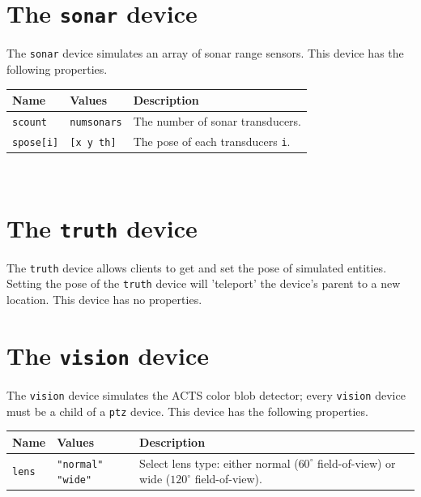 \documentclass[11pt]{report}
\begin{document}
\newpage
\section{The {\tt sonar} device}

The {\tt sonar} device simulates an array of sonar range sensors.
This device has the following properties.
\vspace{1em}\\\noindent
\begin{tabularx}{\columnwidth}{llX}
\hline
Name & Values & Description \\
\hline

\verb'scount' & \verb'numsonars' & The number of sonar transducers.\\

\verb'spose[i]' & \verb'[x y th]' & The pose of each transducers {\tt i}.\\

\hline
\end{tabularx}
\vspace{1em}\\


\newpage
\section{The {\tt truth} device}

The {\tt truth} device allows clients to get and set the pose of
simulated entities.  Setting the pose of the {\tt truth} device will
'teleport' the device's parent to a new location.
This device has no properties.


\newpage
\section{The {\tt vision} device}

The {\tt vision} device simulates the ACTS color blob detector; every
{\tt vision} device must be a child of a {\tt ptz} device.
This device has the following properties.
\vspace{1em}\\\noindent
\begin{tabularx}{\columnwidth}{llX}
\hline
Name & Values & Description \\
\hline

\verb'lens' & \verb'"normal"' \verb'"wide"' & Select lens type: either
normal ($60^\circ$ field-of-view) or wide ($120^\circ$
field-of-view).\\

\hline
\end{tabularx}
\vspace{1em}\\
\end{document}
